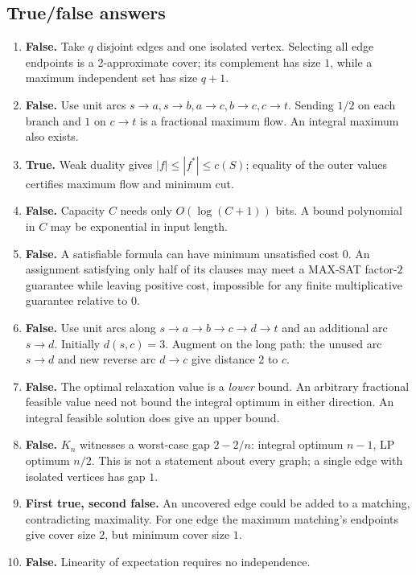 \subsection{True/false answers}
\begin{enumerate}[label=\textbf{T\arabic*.}]
  \item \textbf{False.} Take $q$ disjoint edges and one isolated vertex.
        Selecting all edge endpoints is a 2-approximate cover; its complement
        has size $1$, while a maximum independent set has size $q+1$.
  \item \textbf{False.} Use unit arcs $s\to a,s\to b,a\to c,b\to c,c\to t$.
        Sending $1/2$ on each branch and $1$ on $c\to t$ is a fractional
        maximum flow.  An integral maximum also exists.
  \item \textbf{True.} Weak duality gives $|f|\le|f^*|\le c(S)$;
        equality of the outer values certifies maximum flow and minimum cut.
  \item \textbf{False.} Capacity $C$ needs only $O(\log(C+1))$ bits.
        A bound polynomial in $C$ may be exponential in input length.
  \item \textbf{False.} A satisfiable formula can have minimum unsatisfied
        cost $0$.  An assignment satisfying only half of its clauses may
        meet a MAX-SAT factor-$2$ guarantee while leaving positive cost,
        impossible for any finite multiplicative guarantee relative to $0$.
  \item \textbf{False.} Use unit arcs along $s\to a\to b\to c\to d\to t$
        and an additional arc $s\to d$.  Initially $d(s,c)=3$.  Augment
        on the long path: the unused arc $s\to d$ and new reverse arc
        $d\to c$ give distance $2$ to $c$.
  \item \textbf{False.} The optimal relaxation value is a \emph{lower}
        bound.  An arbitrary fractional feasible value need not bound the
        integral optimum in either direction.  An integral feasible solution
        does give an upper bound.
  \item \textbf{False.} $K_n$ witnesses a worst-case gap $2-2/n$:
        integral optimum $n-1$, LP optimum $n/2$.  This is not a statement
        about every graph; a single edge with isolated vertices has gap $1$.
  \item \textbf{First true, second false.} An uncovered edge could be added
        to a matching, contradicting maximality.  For one edge the maximum
        matching's endpoints give cover size $2$, but minimum cover size $1$.
  \item \textbf{False.} Linearity of expectation requires no independence.
\end{enumerate}
